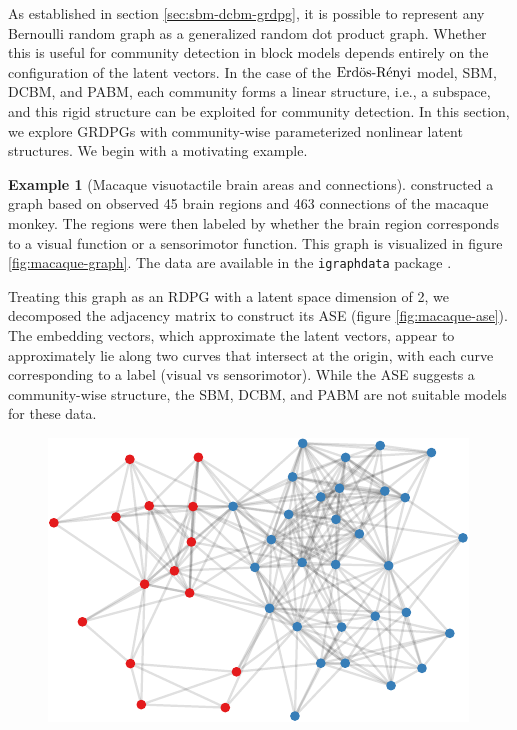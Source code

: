 \documentclass[
  12pt,
]{article}
\theoremstyle{definition}
\theoremstyle{definition}
\newtheorem{example}{Example}[section]
\theoremstyle{definition}
\theoremstyle{definition}
\theoremstyle{remark}
\begin{document}
As established in section \ref{sec:sbm-dcbm-grdpg}, it is possible to represent any Bernoulli random graph as a generalized random dot product graph.
Whether this is useful for community detection in block models depends entirely on the configuration of the latent vectors.
In the case of the \(\text{Erd\"{o}s-R\'{e}nyi}\) model, SBM, DCBM, and PABM, each community forms a linear structure, i.e., a subspace, and this rigid structure can be exploited for community detection.
In this section, we explore GRDPGs with community-wise parameterized nonlinear latent structures.
We begin with a motivating example.

\begin{example}[Macaque visuotactile brain areas and connections]
\label{ex:macaque}
\citet{https://doi.org/10.1111/j.1460-9568.2006.04678.x} constructed a graph based on observed 45 brain regions and 463 connections of the macaque monkey. 
The regions were then labeled by whether the brain region corresponds to a visual function or a sensorimotor function. 
This graph is visualized in figure \ref{fig:macaque-graph}. 
The data are available in the \texttt{igraphdata} package \citep{igraph}. 

Treating this graph as an RDPG with a latent space dimension of 2, 
we decomposed the adjacency matrix to construct its ASE (figure \ref{fig:macaque-ase}). 
The embedding vectors, which approximate the latent vectors, appear to approximately lie along two curves that intersect at the origin, with each curve corresponding to a label (visual vs sensorimotor). 
While the ASE suggests a community-wise structure, the SBM, DCBM, and PABM are not suitable models for these data. 

\begin{figure}[H]

{\centering \includegraphics{draft_files/figure-latex/macaque-graph-1} 

}
\end{figure}
\end{example}
\end{document}
